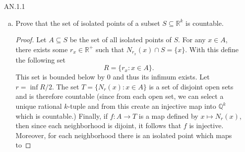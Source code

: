 \documentclass[12pt]{article}
\begin{document}
\begin{enumerate}
\begin{enumerate}[(a)]
                    \begin{proof}
                        Let $g\in G$. Then by assumption $c(g)=\{g\}$ or
                        $c(g)=\{g, x\}$, where $x\neq g$. If the only conjugate
                        of $g$ is itself, then $C_G(g)=G$ and $G\unlhd G$
                        trivially. Assume that $c(g)=\{g, x\}$. Then for any
                        $h\in G$, $hgh^{-1}=g$ or $hgh^{-1}=x$. This implies
                        that 
                        \begin{equation*}
                            G/C_G(g)=\{C_G(g), G\backslash C_G(g)\}.
                        \end{equation*}
                        Hence $[G:C_G(g)]=2$ and therefore $C_G(g)\unlhd G$. 
                    \end{proof}
            \end{enumerate}
        \item[AN.1.1]\hfill\par
            \begin{enumerate}[(a)]
                \item Prove that the set of isolated points of a subset
                    $S\subseteq\mathbb{R}^k$ is countable. 
                    \begin{proof}
                        Let $A\subseteq S$ be the set of all isolated points of
                        $S$. For any $x\in A$, there exists some
                        $r_x\in\mathbb{R}^{+}$ such that $N_{r_x}(x)\cap
                        S=\{x\}$. With this define the following set
                        \begin{equation*}
                            R=\{r_x:x\in A\}.
                        \end{equation*}
                        This set is bounded below by 0 and thus its infimum
                        exists. Let $r=\inf R/2$. The set $T=\{N_r(x):x\in A\}$
                        is a set of disjoint open sets and is therefore
                        countable (since from each open set, we can select
                        a unique rational $k$-tuple and from this create an
                        injective map into $\mathbb{Q}^k$ which is countable.)
                        Finally, if $f:A\to T$ is a map defined by $x\mapsto
                        N_r(x)$, then since each neighborhood is dijoint, it
                        follows that $f$ is injective. Moreover, for each
                        neighborhood there is an isolated point which maps to

\end{proof}
\end{enumerate}
\end{enumerate}
\end{document}
